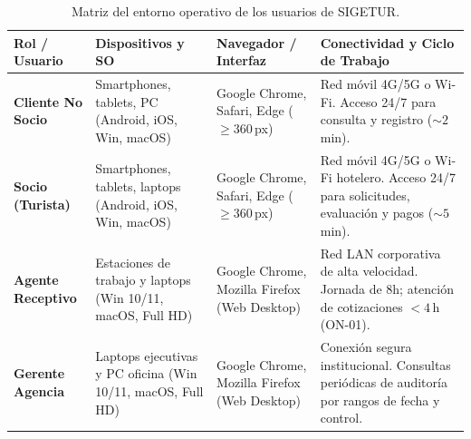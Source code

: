 \begin{table}[H]
\centering
\scriptsize
\begin{tabularx}{\textwidth}{llLL}
\toprule
\textbf{Rol / Usuario} & \textbf{Dispositivos y SO} & \textbf{Navegador / Interfaz} & \textbf{Conectividad y Ciclo de Trabajo} \\
\midrule
\textbf{Cliente No Socio} & Smartphones, tablets, PC (Android, iOS, Win, macOS) & Google Chrome, Safari, Edge ($\ge 360$\,px) & Red móvil 4G/5G o Wi-Fi. Acceso 24/7 para consulta y registro ($\sim 2$\,min). \\ \midrule
\textbf{Socio (Turista)} & Smartphones, tablets, laptops (Android, iOS, Win, macOS) & Google Chrome, Safari, Edge ($\ge 360$\,px) & Red móvil 4G/5G o Wi-Fi hotelero. Acceso 24/7 para solicitudes, evaluación y pagos ($\sim 5$\,min). \\ \midrule
\textbf{Agente Receptivo} & Estaciones de trabajo y laptops (Win 10/11, macOS, Full HD) & Google Chrome, Mozilla Firefox (Web Desktop) & Red LAN corporativa de alta velocidad. Jornada de 8h; atención de cotizaciones $< 4$\,h (ON-01). \\ \midrule
\textbf{Gerente Agencia} & Laptops ejecutivas y PC oficina (Win 10/11, macOS, Full HD) & Google Chrome, Mozilla Firefox (Web Desktop) & Conexión segura institucional. Consultas periódicas de auditoría por rangos de fecha y control. \\
\bottomrule
\end{tabularx}
\caption{Matriz del entorno operativo de los usuarios de SIGETUR.}\label{tab:entorno_usuario}
\end{table}

